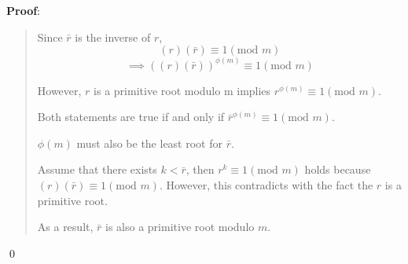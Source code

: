 \documentclass{article} %
\begin{document}
\bigskip
\noindent
\textbf{Proof}:
\begin{quote}
    Since $\bar{r}$ is the inverse of $r$,
    \[(r)(\bar{r}) \equiv 1 (\text{mod }m) \]
    \[\implies ((r)(\bar{r}))^{\phi(m)} \equiv 1 (\text{mod }m)\]

    However, $r$ is a primitive root modulo m implies $r^{\phi(m)} \equiv 1 (\text{mod }m)$.

    Both statements are true if and only if $\bar{r}^{\phi(m)} \equiv 1 (\text{mod }m)$.

    \bigskip
    $\phi(m)$ must also be the least root for $\bar{r}$.

    Assume that there exists $k < \bar{r}$, then $r^k \equiv 1 (\text{mod }m)$ holds because $(r)(\bar{r}) \equiv 1 (\text{mod }m)$. However, this contradicts with the fact the $r$ is a primitive root.

    \bigskip
    As a result, $\bar{r}$ is also a primitive root modulo $m$.




\end{quote}

\qed
\bigskip
\end{document}
